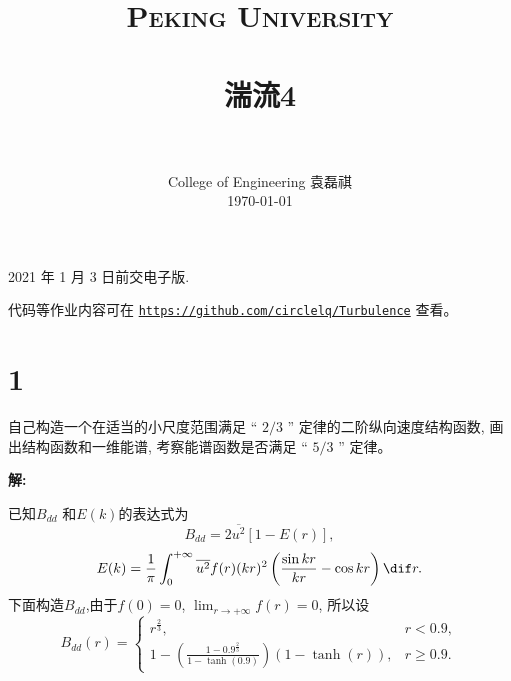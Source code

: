 \documentclass[12pt,a4]{ctexart}
\title{
   \vspace{-1in}
   \usefont{OT1}{bch}{b}{n}
   \normalfont \normalsize \textsc{\LARGE Peking University}\\[1cm] %
   \horrule{0.5pt} \\[0.5cm]
   \huge \bfseries{湍流4} \\
   \horrule{2pt} \\[0.5cm]
}
\author{
   \normalfont									\normalsize
   College of Engineering \quad 2001111690  \quad 袁磊祺\\	\normalsize
   \today
}
\date{}
\begin{document}


\maketitle

2021 年 1 月 3 日前交电子版.

代码等作业内容可在 \texttt{\href{https://github.com/circlelq/Turbulence}{https://github.com/circlelq/Turbulence}} 查看。


\section{1}

自己构造一个在适当的小尺度范围满足 “ $2 / 3$ ” 定律的二阶纵向速度结构函数, 画出结构函数和一维能谱, 考察能谱函数是否满足 “ $5 / 3$ ” 定律。

\textsf{\hspace{-2em}\sf  \textbf{解:}}

已知$B_{d d}$ 和$E(k)$的表达式为\cite{shi}
\begin{equation}
   B_{d d} = 2 \overline{u^2} [1 - E(r)],
\end{equation}
\begin{equation}
   E(k) = \frac{1}{\pi} \int_{0}^{+\infty} \overline{u^2}f(r)(kr)^2\left( \frac{\sin kr}{kr} - \cos kr \right) \dif r.
   \label{eq:1-1}
\end{equation}
下面构造$B_{d d}$,由于$f(0)=0$, $\lim_{r \to +\infty} f(r) = 0$, 所以设
\begin{equation}
   B_{d d}(r) = \begin{cases}
	  r^{\frac{2}{3}} , & r < 0.9, \\
	  1 - \left(\frac{1 - 0.9^{\frac{2}{3}}}{1 - \tanh(0.9)}\right)(1 - \tanh(r)), & r \ge  0.9.
   \end{cases}
\end{equation}
\end{document}
